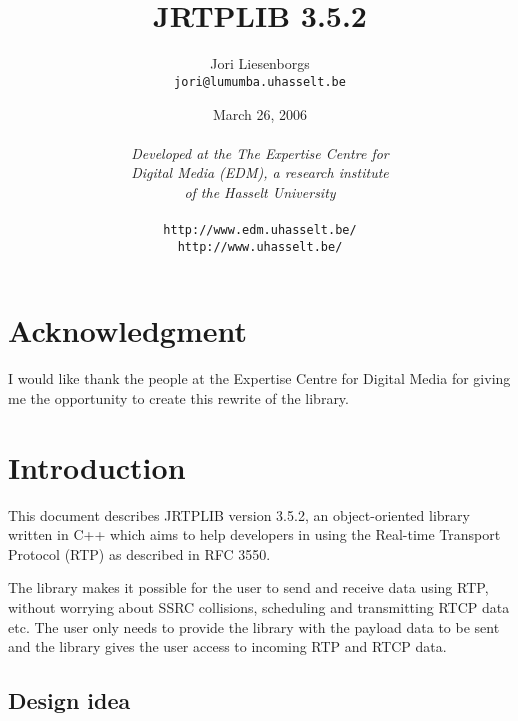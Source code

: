 \documentclass[12pt,a4paper]{article}
\newcommand{\jversion}{3.5.2}
\begin{document}
	\title{\ \vspace{3.5cm}\ \\{\bf JRTPLIB \jversion}}
	\author{Jori Liesenborgs\\{\tt jori@lumumba.uhasselt.be}}
	\date{March 26, 2006\\\vspace{0.5cm}\ \\
	      {\small{\em Developed at the The Expertise Centre for \\Digital Media (EDM),
	      a research institute\\of the Hasselt University}\\\ \\
		  {\tt http://www.edm.uhasselt.be/}\\
		  {\tt http://www.uhasselt.be/}}}
	\maketitle
	
	\newpage
	\tableofcontents

\setlength{\parindent}{0cm}
\setlength{\parskip}{0.3cm}

	\newpage
	\section*{Acknowledgment}

		I would like thank the people at the Expertise Centre for Digital Media
		for giving me the opportunity to create this rewrite of the library.

	\newpage
	\section{Introduction}

		This document describes JRTPLIB version \jversion, an object-oriented
		library written in C++ which aims to help developers in using the 
		Real-time Transport Protocol (RTP) as described in RFC 3550.

		The library makes it possible for the user to send and receive data
		using RTP, without worrying about SSRC collisions, scheduling and
		transmitting RTCP data etc. The user only needs to provide the library
		with the payload data to be sent and the library gives the user access
		to incoming RTP and RTCP data.

		\subsection{Design idea}
\end{document}
